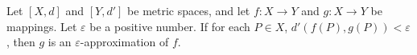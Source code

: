 Let $[X, d]$ and $[Y, d']$ be metric spaces, and let $f: X \rightarrow Y$ and $g: X \rightarrow Y$ be mappings. Let $\varepsilon$ be a positive number. If for each $P \in X$, $d'(f(P), g(P)) < \varepsilon$, then $g$ is an $\varepsilon$-approximation of $f$.
